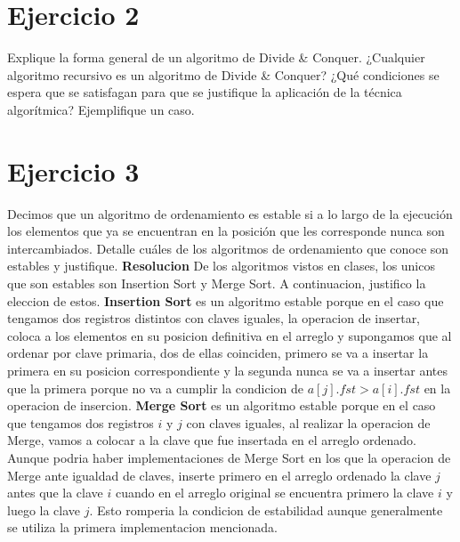 \documentclass[10pt,a4paper]{article}
\begin{document}
\section{Ejercicio 2}

Explique la forma general de un algoritmo de Divide \& Conquer. ¿Cualquier algoritmo recursivo es un algoritmo de Divide \& Conquer? ¿Qué condiciones se espera que se satisfagan para que se justifique la aplicación de la técnica algorítmica? Ejemplifique un caso.
\newpage

\section{Ejercicio 3}

Decimos que un algoritmo de ordenamiento es estable si a lo largo de la ejecución los elementos que ya se encuentran en la posición que les corresponde nunca son intercambiados. Detalle cuáles de los algoritmos de ordenamiento que conoce son estables y justifique.
\newline
\newline
\textbf{Resolucion}
\newline
\newline
De los algoritmos vistos en clases, los unicos que son estables son Insertion Sort y Merge Sort. A continuacion, justifico la eleccion de estos.
\newline
\newline
\textbf{Insertion Sort} es un algoritmo estable porque en el caso que tengamos dos registros distintos con claves iguales, la operacion de insertar, coloca a los elementos en su posicion definitiva en el arreglo y supongamos que al ordenar por clave primaria, dos de ellas coinciden, primero se va a insertar la primera en su posicion correspondiente y la segunda nunca se va a insertar antes que la primera porque no va a cumplir la condicion de $a[j].fst > a[i].fst$ en la operacion de insercion. 
\newline
\newline
\textbf{Merge Sort} es un algoritmo estable porque en el caso que tengamos dos registros $i$ y $j$ con claves iguales, al realizar la operacion de Merge, vamos a colocar a la clave que fue insertada en el arreglo ordenado. Aunque podria haber implementaciones de Merge Sort en los que la operacion de Merge ante igualdad de claves, inserte primero en el arreglo ordenado la clave $j$ antes que la clave $i$ cuando en el arreglo original se encuentra primero la clave $i$ y luego la clave $j$. Esto romperia la condicion de estabilidad aunque generalmente se utiliza la primera implementacion mencionada.

\newpage
\end{document}
